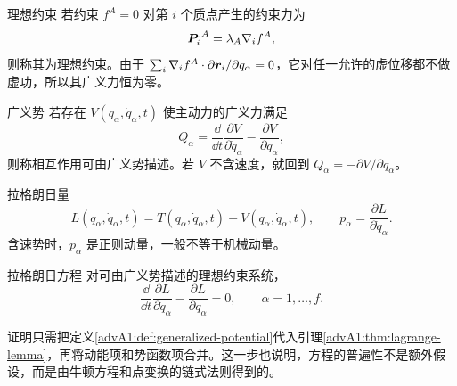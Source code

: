 \begin{advdefinition}{理想约束}\label{advA1:def:ideal-constraint}
若约束 $f^A=0$ 对第 $i$ 个质点产生的约束力为
\[
 \bm{P}_i^{,A}=\lambda_A\nabla_i f^A,
\]
则称其为理想约束。由于
$\sum_i\nabla_i f^A\cdot\partial\bm{r}_i/\partial q_\alpha=0$，它对任一允许的虚位移都不做虚功，所以其广义力恒为零。
\end{advdefinition}

\begin{advdefinition}{广义势}\label{advA1:def:generalized-potential}
若存在 $V(q_\alpha,\dot q_\alpha,t)$ 使主动力的广义力满足
\[
 Q_\alpha=\frac{\dd}{\dd t}\frac{\partial V}{\partial\dot q_\alpha}
 -\frac{\partial V}{\partial q_\alpha},
\]
则称相互作用可由广义势描述。若 $V$ 不含速度，就回到 $Q_\alpha=-\partial V/\partial q_\alpha$。
\end{advdefinition}

\begin{advdefinition}{拉格朗日量}\label{advA1:def:lagrangian}
\[
 L(q_\alpha,\dot q_\alpha,t)=T(q_\alpha,\dot q_\alpha,t)
 -V(q_\alpha,\dot q_\alpha,t),
 \qquad p_\alpha=\frac{\partial L}{\partial\dot q_\alpha}.
\]
含速势时，$p_\alpha$ 是正则动量，一般不等于机械动量。
\end{advdefinition}

\begin{advtheorem}{拉格朗日方程}\label{advA1:thm:lagrange}
对可由广义势描述的理想约束系统，
\begin{equation}\label{advA1:eq:lagrange}
 \frac{\dd}{\dd t}\frac{\partial L}{\partial\dot q_\alpha}
 -\frac{\partial L}{\partial q_\alpha}=0,
 \qquad \alpha=1,\ldots,f .
\end{equation}
\end{advtheorem}
证明只需把定义\ref{advA1:def:generalized-potential}代入引理\ref{advA1:thm:lagrange-lemma}，再将动能项和势函数项合并。这一步也说明，方程的普遍性不是额外假设，而是由牛顿方程和点变换的链式法则得到的。

